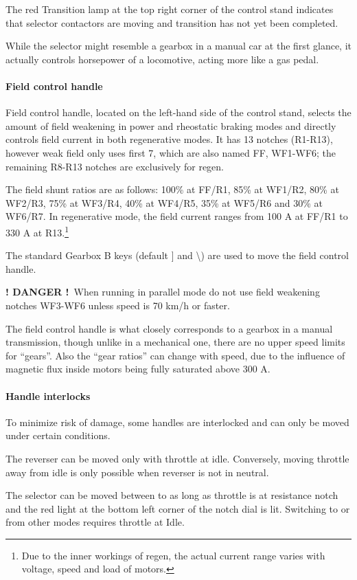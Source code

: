 \documentclass[11pt, a4paper]{article}
\newcommand{\powermode}[1]{%
    \begingroup
    \setlength{\fboxsep}{0pt}%
    \raisebox{0.1em}{%
        \colorbox{black}{%
            \parbox[c][1.4em][c]{1.4em}{%
                \centering
                \color{white}\bfseries #1%
            }%
        }%
    }%
    \endgroup
}
\newcommand{\danger}{\textbf{\color{red} ! DANGER !}}
\begin{document}
The red Transition lamp at the top right corner of the control stand indicates that selector contactors are moving and transition has not yet been completed.

While the selector might resemble a gearbox in a manual car at the first glance, it actually controls horsepower of a locomotive, acting more like a gas pedal.
\newpage

\paragraph{Field control handle}
Field control handle, located on the left-hand side of the control stand, selects the amount of field weakening in power and rheostatic braking modes and directly controls field current in both regenerative modes. It has 13 notches (R1-R13), however weak field only uses first 7, which are also named FF, WF1-WF6; the remaining R8-R13 notches are exclusively for regen.

The field shunt ratios are as follows: 100\% at FF/R1, 85\% at WF1/R2, 80\% at WF2/R3, 75\% at WF3/R4, 40\% at WF4/R5, 35\% at WF5/R6 and 30\% at WF6/R7. In regenerative mode, the field current ranges from 100 A at FF/R1 to 330 A at R13.\footnote{Due to the inner workings of regen, the actual current range varies with voltage, speed and load of motors.}

The standard Gearbox B keys (default ] and \textbackslash) are used to move the field control handle.

\danger\ When running in parallel \powermode{P} mode do not use field weakening notches WF3-WF6 unless speed is 70 km/h or faster.

The field control handle is what closely corresponds to a gearbox in a manual transmission, though unlike in a mechanical one, there are no upper speed limits for ``gears''. Also the ``gear ratios'' can change with speed, due to the influence of magnetic flux inside motors being fully saturated above 300 A.

\paragraph{Handle interlocks}
To minimize risk of damage, some handles are interlocked and can only be moved under certain conditions.

The reverser can be moved only with throttle at idle. Conversely, moving throttle away from idle is only possible when reverser is not in neutral.

The selector can be moved between \powermode{S} to \powermode{P} as long as throttle is at resistance notch and the red light at the bottom left corner of the notch dial is lit. Switching to or from other modes requires throttle at Idle.
\end{document}
